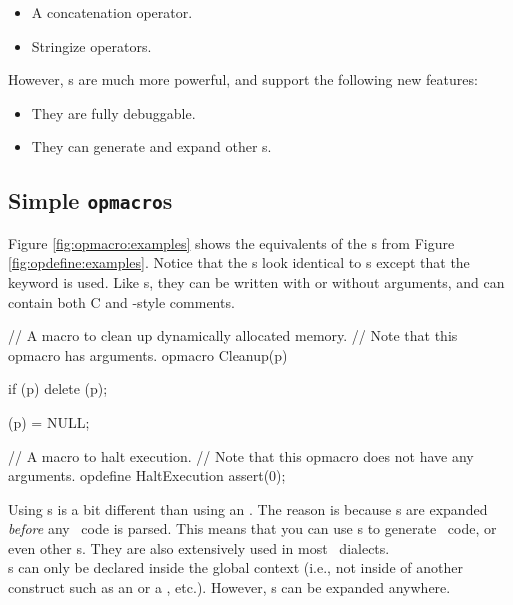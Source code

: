 {\begin{itemize}
\item A concatenation operator.
\item Stringize operators.
\end{itemize}

However, s are much more powerful, and support the following new features:

\begin{itemize}
\item They are fully debuggable.
\item They can generate and expand other s.
\end{itemize}

\subsection{Simple {\tt opmacro}s}
\label{subsec:simpleopmacros}

Figure \ref{fig:opmacro:examples} shows the  equivalents of the s from Figure \ref{fig:opdefine:examples}.  Notice that the s look identical to s except that the  keyword is used.  Like s, they can be written with or without arguments, and can contain both C and \cpp-style comments.

\begin{opcpp}[label={fig:opmacro:examples},caption={Example \opcppk{opmacro} declarations.}]
// A macro to clean up dynamically allocated memory.
// Note that this opmacro has arguments.
opmacro Cleanup(p)
{
   if (p)
      delete (p);

   (p) = NULL;
}

// A macro to halt execution.
// Note that this opmacro does not have any arguments.
opdefine HaltExecution
{ 
    assert(0); 
} 
\end{opcpp}

Using s is a bit different than using an .  The reason is because s are expanded \textit{before} any \opCPP\ code is parsed.  This means that you can use s to generate \opCPP\ code, or even other s.  They are also extensively used in most \opCPP\ dialects. \\ 

s can only be declared inside the global context (i.e., not inside of another construct such as an  or a , etc.).  However, s can be expanded anywhere. \\

}
